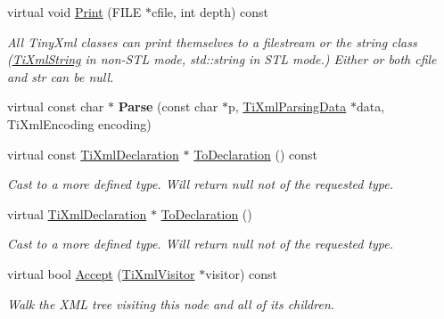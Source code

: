 \begin{DoxyCompactItemize}
\item 
virtual void \hyperlink{class_ti_xml_declaration_abf6303db4bd05b5be554036817ff1cb4}{Print} (F\+I\+LE $\ast$cfile, int depth) const 
\begin{DoxyCompactList}\small\item\em All Tiny\+Xml classes can print themselves to a filestream or the string class (\hyperlink{class_ti_xml_string}{Ti\+Xml\+String} in non-\/\+S\+TL mode, std\+::string in S\+TL mode.) Either or both cfile and str can be null. \end{DoxyCompactList}\item 
virtual const char $\ast$ {\bfseries Parse} (const char $\ast$p, \hyperlink{class_ti_xml_parsing_data}{Ti\+Xml\+Parsing\+Data} $\ast$data, Ti\+Xml\+Encoding encoding)\hypertarget{class_ti_xml_declaration_a9839ea97ed687a2b7342fd7b0f04361b}{}\label{class_ti_xml_declaration_a9839ea97ed687a2b7342fd7b0f04361b}

\item 
virtual const \hyperlink{class_ti_xml_declaration}{Ti\+Xml\+Declaration} $\ast$ \hyperlink{class_ti_xml_declaration_a1e085d3fefd1dbf5ccdbff729931a967}{To\+Declaration} () const \hypertarget{class_ti_xml_declaration_a1e085d3fefd1dbf5ccdbff729931a967}{}\label{class_ti_xml_declaration_a1e085d3fefd1dbf5ccdbff729931a967}

\begin{DoxyCompactList}\small\item\em Cast to a more defined type. Will return null not of the requested type. \end{DoxyCompactList}\item 
virtual \hyperlink{class_ti_xml_declaration}{Ti\+Xml\+Declaration} $\ast$ \hyperlink{class_ti_xml_declaration_a6bd3d1daddcaeb9543c24bfd090969ce}{To\+Declaration} ()\hypertarget{class_ti_xml_declaration_a6bd3d1daddcaeb9543c24bfd090969ce}{}\label{class_ti_xml_declaration_a6bd3d1daddcaeb9543c24bfd090969ce}

\begin{DoxyCompactList}\small\item\em Cast to a more defined type. Will return null not of the requested type. \end{DoxyCompactList}\item 
virtual bool \hyperlink{class_ti_xml_declaration_ab6a6b178161ba9abc2c35058de689864}{Accept} (\hyperlink{class_ti_xml_visitor}{Ti\+Xml\+Visitor} $\ast$visitor) const \hypertarget{class_ti_xml_declaration_ab6a6b178161ba9abc2c35058de689864}{}\label{class_ti_xml_declaration_ab6a6b178161ba9abc2c35058de689864}

\begin{DoxyCompactList}\small\item\em Walk the X\+ML tree visiting this node and all of its children. \end{DoxyCompactList}\end{DoxyCompactItemize}
